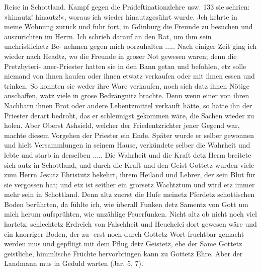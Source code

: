 Reise in Schottland. Kampf gegen die Prädeftinationzlehre usw. 133
sie schrien: »hinautz! hinautz!«, woraus ich wieder hinautzgesührt
wurde. Jch kehrte in meine Wohnung zurück und fuhr fort, in
Gdinburg die Freunde zu besuchen und auszurichten im Herrn.
Ich schrieb darauf an den Rat, um ihm sein unchristlichetz Be-
nehmen gegen mich oorzuhalten .....
Nach einiger Zeit ging ich wieder nach Headtz, wo die
Freunde in groser Not gewesen waren; denn die Pretzbyteri-
aner-Priester hatten sie in den Bann getan und befohlen,
etz solle niemand von ihnen kaufen oder ihnen etwatz
verkaufen oder mit ihnen essen und trinken. So konnten sie weder
ihre Ware verkaufen, noch sich datz ihnen Nötige anschaffen, watz
viele in grose Bedrängnitz brachte. Denn wenn einer von ihren
Nachbarn ihnen Brot oder andere Lebentzmittel verkauft hätte, so
hätte ihn der Priester derart bedroht, das er schleunigst gekommen
wäre, die Sachen wieder zu holen. Aber Oberst Ashsield, welcher
der Friedentzrichter jener Gegend war, machte diesem Vorgehen
der Priester ein Ende. Später wurde er selber gewonnen und hielt
Versammlungen in seinem Hause, verkündete selber die Wahrheit
und lebte und starb in derselben .....
Die Wahrheit und die Kraft detz Herm breitete sich autz in
Schottland, und durch die Kraft und den Geist Gottetz wurden
viele zum Herrn Jesutz Ehristutz bekehrt, ihrem Heiland und Lehrer,
der sein Blut für sie vergossen hat; und etz ist seither ein grorsetz
Wachtztum und wird etz immer mehr sein in Schottland. Denn
altz zuerst die Hufe meinetz Pferdetz schottischen Boden berührten,
da fühlte ich, wie überall Funken detz Samentz von Gott um mich
herum aufsprühten, wie unzählige Feuerfunken. Nicht altz ob
nicht noch viel hartetz, schlechtetz Erdreich von Falschheit und
Heuchelei dort gewesen wäre und ein knorriger Boden, der zu-
erst noch durch Gottetz Wort fruchtbar gemacht werden mus
und gepfliigt mit dem Pflug detz Geistetz, ehe der Same Gottetz
geistliche, himmlische Früchte hervorbringen kann zu Gottetz Ehre.
Aber der Landmann mus in Geduld warten (Jar. 5, 7).

